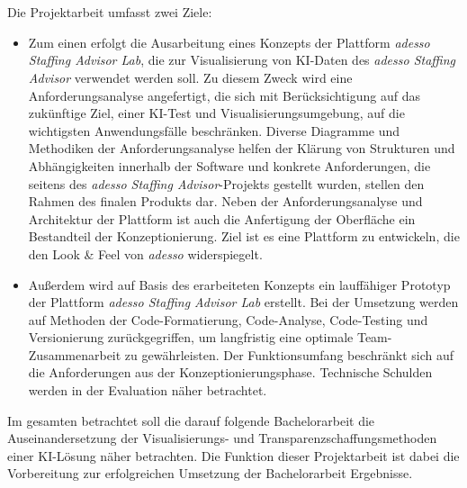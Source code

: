 \documentclass[a4paper,12pt]{scrreprt}
\newcommand{\hiddenchapter}[1]{
	\stepcounter{chapter}
	\chapter*{\arabic{chapter}\hspace{1em}{#1}}
}
\begin{document}
\hiddenchapter{Ziele und Ergebnisse der Arbeit}\mbox{}
Die Projektarbeit umfasst zwei Ziele:
\begin{itemize}
\item Zum einen erfolgt die Ausarbeitung eines Konzepts der Plattform \emph{adesso Staffing Advisor Lab}, die zur Visualisierung von KI-Daten des \emph{adesso Staffing Advisor} verwendet werden soll. Zu diesem Zweck wird eine Anforderungsanalyse angefertigt, die sich mit Berücksichtigung auf das zukünftige Ziel, einer KI-Test und Visualisierungsumgebung, auf die wichtigsten Anwendungsfälle beschränken. Diverse Diagramme und Methodiken der Anforderungsanalyse helfen der Klärung von Strukturen und Abhängigkeiten innerhalb der Software und konkrete Anforderungen, die seitens des \emph{adesso Staffing Advisor}-Projekts gestellt wurden, stellen den Rahmen des finalen Produkts dar. Neben der Anforderungsanalyse und Architektur der Plattform ist auch die Anfertigung der Oberfläche ein Bestandteil der Konzeptionierung. Ziel ist es eine Plattform zu entwickeln, die den \glqq Look \& Feel\grqq{} von \emph{adesso} widerspiegelt.
\item Außerdem wird auf Basis des erarbeiteten Konzepts ein lauffähiger Prototyp der Plattform \emph{adesso Staffing Advisor Lab} erstellt. Bei der Umsetzung werden auf Methoden der Code-Formatierung, Code-Analyse, Code-Testing und Versionierung zurückgegriffen, um langfristig eine optimale Team-Zusammenarbeit zu gewährleisten. Der Funktionsumfang beschränkt sich auf die Anforderungen aus der Konzeptionierungsphase. Technische Schulden werden in der Evaluation näher betrachtet.
\end{itemize}
Im gesamten betrachtet soll die darauf folgende Bachelorarbeit die Auseinandersetzung der Visualisierungs- und Transparenzschaffungsmethoden einer KI-Lösung näher betrachten. Die Funktion dieser Projektarbeit ist dabei die Vorbereitung zur erfolgreichen Umsetzung der Bachelorarbeit Ergebnisse.
\newpage






\end{document}
